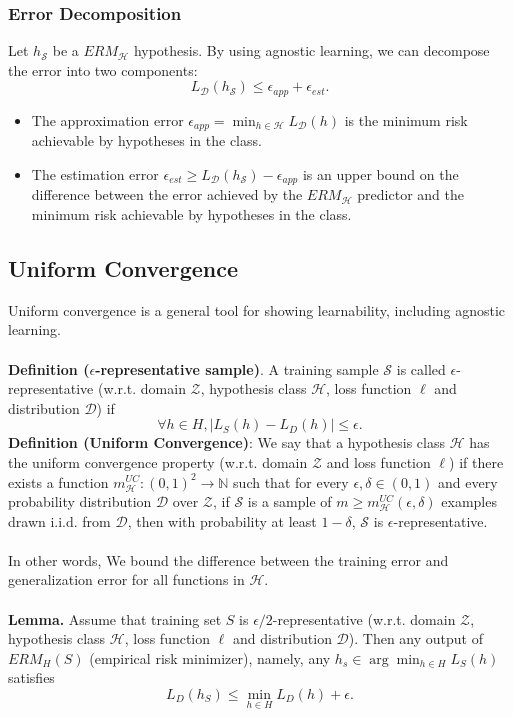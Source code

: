\documentclass{article}
\begin{document}
   \subsubsection{Error Decomposition}
   Let $h_\mathcal{S}$ be a $ERM_\mathcal{H}$ hypothesis. By using agnostic learning, we can decompose the error into two components:
   \begin{equation}
   L_{\mathcal{D}} (h_\mathcal{S}) \leq  \epsilon_{app} + \epsilon_{est}.
   \end{equation}
   \begin{itemize}
   \item The approximation error $\epsilon_{app} = \min_{h \in \mathcal{H}} L_\mathcal{D}(h)$ is the minimum risk achievable by hypotheses in the class. 
   \item The estimation error $\epsilon_{est} \geq L_{\mathcal{D}} (h_\mathcal{S}) - \epsilon_{app}$ is an upper bound on the difference between the error achieved by the $ERM_\mathcal{H}$ predictor and the minimum risk achievable by hypotheses in the class.
   \end{itemize}
   
   \subsection{Uniform Convergence}
   Uniform convergence is a general tool for showing learnability, including agnostic learning.
   \\\\
   \textbf{Definition (}$\epsilon$\textbf{-representative sample)}. A training sample $\mathcal{S}$ is called $\epsilon$-representative (w.r.t. domain $\mathcal{Z}$, hypothesis class $\mathcal{H}$, loss function $\ell$ and distribution $\mathcal{D}$) if
   \begin{equation}
   \forall h \in H, |L_S(h)-L_D(h)| \leq \epsilon.
   \end{equation}
   \textbf{Definition (Uniform Convergence)}: We say that a hypothesis class $\mathcal{H}$ has the uniform convergence property (w.r.t. domain $\mathcal{Z}$ and loss function $\ell$) if there exists a function $m_\mathcal{H}^{UC}:(0,1)^2 \rightarrow \mathbb{N}$ such that for every $\epsilon, \delta \in (0,1)$ and every probability distribution $\mathcal{D}$ over $\mathcal{Z}$, if $\mathcal{S}$ is a sample of $m \geq m_\mathcal{H}^{UC}(\epsilon, \delta)$ examples drawn i.i.d. from $\mathcal{D}$, then with probability at least $1-\delta$, $\mathcal{S}$ is $\epsilon$-representative.
   \\\\
   In other words, We bound the difference between the training error and generalization error for all functions in $\mathcal{H}$.
   \\\\
   \textbf{Lemma.} Assume that training set $S$ is $\epsilon/2$-representative (w.r.t. domain $\mathcal{Z}$, hypothesis class $\mathcal{H}$, loss function $\ell$ and distribution $\mathcal{D}$). Then any output of $ERM_H(S)$ (empirical risk minimizer), namely, any $h_s \in \arg \min_{h\in H} L_S(h)$ satisfies
   \begin{equation}
   L_D(h_S) \leq \min_{h\in H} L_D(h) + \epsilon.
   \end{equation}
   
\end{document}
